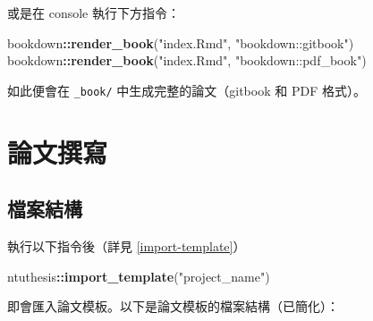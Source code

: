 \documentclass[oneside]{book}
\newenvironment{Shaded}{\begin{snugshade}}{\end{snugshade}}
\newcommand{\KeywordTok}[1]{\textcolor[rgb]{0.13,0.29,0.53}{\textbf{#1}}}
\newcommand{\NormalTok}[1]{#1}
\newcommand{\OperatorTok}[1]{\textcolor[rgb]{0.81,0.36,0.00}{\textbf{#1}}}
\newcommand{\StringTok}[1]{\textcolor[rgb]{0.31,0.60,0.02}{#1}}
\theoremstyle{definition}
\theoremstyle{definition}
\theoremstyle{definition}
\theoremstyle{remark}
\begin{document}
或是在 console 執行下方指令：

\begin{Shaded}
\begin{Highlighting}[]
\NormalTok{bookdown}\OperatorTok{::}\KeywordTok{render_book}\NormalTok{(}\StringTok{"index.Rmd"}\NormalTok{, }\StringTok{"bookdown::gitbook"}\NormalTok{)}
\NormalTok{bookdown}\OperatorTok{::}\KeywordTok{render_book}\NormalTok{(}\StringTok{"index.Rmd"}\NormalTok{, }\StringTok{"bookdown::pdf_book"}\NormalTok{)}
\end{Highlighting}
\end{Shaded}

如此便會在 \texttt{\_book/} 中生成完整的論文（gitbook 和 PDF 格式）。

\hypertarget{write-thesis}{%
\chapter{論文撰寫}\label{write-thesis}}

\hypertarget{dir-structure}{%
\section{檔案結構}\label{dir-structure}}

執行以下指令後（詳見 \ref{import-template}）

\begin{Shaded}
\begin{Highlighting}[]
\NormalTok{ntuthesis}\OperatorTok{::}\KeywordTok{import_template}\NormalTok{(}\StringTok{"project_name"}\NormalTok{)}
\end{Highlighting}
\end{Shaded}

即會匯入論文模板。以下是論文模板的檔案結構（已簡化）：
\end{document}
